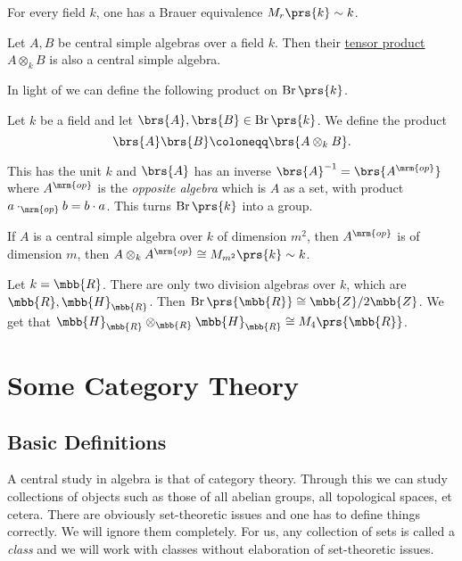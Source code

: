 \documentclass[11pt]{kbook}
\DeclareMathOperator{\Br}{Br}
\newcommand{\op}{{\mrm{op}}}
\begin{document}
\begin{example}
For every field $k$, one has a Brauer equivalence $M_r\prs{k} \sim k$.
\end{example}

\begin{proposition}\label{proposition:CSA_product}
Let $A,B$ be central simple algebras over a field $k$. Then their \href{https://en.wikipedia.org/wiki/Tensor_product_of_algebras}{tensor product} $A \otimes_k B$ is also a central simple algebra.
\end{proposition}

In light of  we can define the following product on $\Br\prs{k}$.

\begin{definition}
Let $k$ be a field and let $\brs{A},\brs{B} \in \Br\prs{k}$. We define the product
\[\brs{A} \brs{B} \coloneqq \brs{A \otimes_k B} \text{.}\]

This has the unit $k$ and $\brs{A}$ has an inverse $\brs{A}^{-1} = \brs{A^\op}$ where $A^\op$ is the \emph{opposite algebra} which is $A$ as a set, with product $a \cdot_\op b = b \cdot a$. This turns $\Br\prs{k}$ into a group.
\end{definition}

\begin{proposition}
If $A$ is a central simple algebra over $k$ of dimension $m^2$, then $A^\op$ is of dimension $m$, then $A \otimes_k A^\op \cong M_{m^2}\prs{k} \sim k$.
\end{proposition}

\begin{example}
Let $k = \mbb{R}$. There are only two division algebras over $k$, which are ${\mbb{R}, \mbb{H}_{\mbb{R}}}$. Then $\Br\prs{\mbb{R}} \cong \mbb{Z}/2\mbb{Z}$. We get that $\mbb{H}_{\mbb{R}} \otimes_{\mbb{R}} \mbb{H}_{\mbb{R}} \cong M_4\prs{\mbb{R}}$.
\end{example}

\chapter{Some Category Theory}

\section{Basic Definitions}

A central study in algebra is that of category theory. Through this we can study collections of objects such as those of all abelian groups, all topological spaces, et cetera.
There are obviously set-theoretic issues and one has to define things correctly. We will ignore them completely. For us, any collection of sets is called a \emph{class} and we will work with classes without elaboration of set-theoretic issues.
\end{document}
